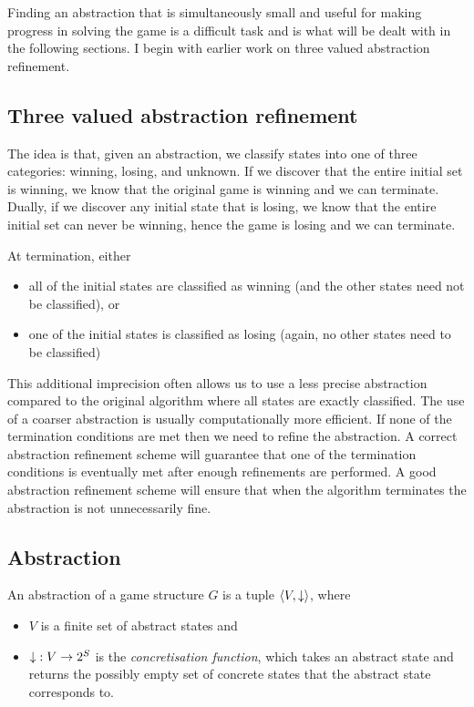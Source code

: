 Finding an abstraction that is simultaneously small and useful for making progress in solving the game is a difficult task and is what will be dealt with in the following sections. I begin with earlier work on three valued abstraction refinement. 

\subsection{Three valued abstraction refinement}
\label{sec:three_val_abs_ref}

The idea is that, given an abstraction, we classify states into one of three categories: winning, losing, and unknown. If we discover that the entire initial set is winning, we know that the original game is winning and we can terminate. Dually, if we discover any initial state that is losing, we know that the entire initial set can never be winning, hence the game is losing and we can terminate. 

At termination, either 
\begin{itemize}
\item all of the initial states are classified as winning (and the other states need not be classified), or
\item one of the initial states is classified as losing (again, no other states need to be classified)
\end{itemize}

This additional imprecision often allows us to use a less precise abstraction compared to the original algorithm where all states are exactly classified. The use of a coarser abstraction is usually computationally more efficient. If none of the termination conditions are met then we need to refine the abstraction. A correct abstraction refinement scheme will guarantee that one of the termination conditions is eventually met after enough refinements are performed. A good abstraction refinement scheme will ensure that when the algorithm terminates the abstraction is not unnecessarily fine.

\subsection{Abstraction}
\label{sec:abstraction_def}

An abstraction of a game structure $G$ is a tuple $\langle V, \mathord{\downarrow}\rangle$, where 
\begin{itemize}
    \item $V$ is a finite set of abstract states and 
    \item $\mathord{\downarrow} : V \rightarrow 2^S $ is the \emph{concretisation function}, which takes an abstract state and returns the possibly empty set of concrete states that the abstract state corresponds to.  
\end{itemize}
        
